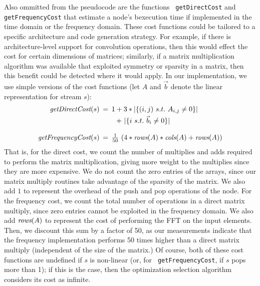 Also ommitted from the pseudocode are the functions {\tt
getDirectCost} and {\tt getFrequencyCost} that estimate a node's
bexecution time if implemented in the time domain or the frequency
domain.  These cost functions could be tailored to a specific
architecture and code generation strategy.  For example, if there is
architecture-level support for convolution operations, then this would
effect the cost for certain dimensions of matrices; similarly, if a
matrix multiplication algorithm was available that exploited symmetry
or sparsity in a matrix, then this benefit could be detected where it
would apply.  In our implementation, we use simple versions of the
cost functions (let $A$ and ${\vec b}$ denote the linear
representation for stream $s$):
\[
\begin{array}{rcl}
\mt{getDirectCost}(s) \hspace{-6pt} & = \hspace{-6pt} & 1 + 3 * |\{ (i,j)~s.t.~A_{i,j} \ne 0\}| \vspace{3pt} \\ 
 ~ & ~ & \hspace{6.8pt}+~|\{ i~s.t.~{\vec b}_i \ne 0 \}| \\ ~ & ~ & ~ \\
\mt{getFrequencyCost}(s)  \hspace{-6pt} & = \hspace{-6pt} & \frac{1}{50}~(4 * \mt{rows}(A) * \mt{cols}(A) + \mt{rows}(A))
\end{array}
\]
That is, for the direct cost, we count the number of multiplies and
adds required to perform the matrix multiplication, giving more weight
to the multiplies since they are more expensive.  We do not count the
zero entries of the arrays, since our matrix multiply routines take
advantage of the sparsity of the matrix.  We also add $1$ to represent
the overhead of the push and pop operations of the node.  For the
frequency cost, we count the total number of operations in a direct
matrix multiply, since zero entries cannot be exploited in the
frequency domain.  We also add $\mbox{\it rows}(A)$ to represent the cost of
performing the FFT on the input elements.  Then, we discount this sum
by a factor of 50, as our measurements indicate that the frequency
implementation performs 50 times higher than a direct matrix multiply
(independent of the size of the matrix.)  Of course, both of these
cost functions are undefined if $s$ is non-linear (or, for {\tt
getFrequencyCost}, if $s$ pops more than 1); if this is the case, then
the optimization selection algorithm considers its cost as infinite.


